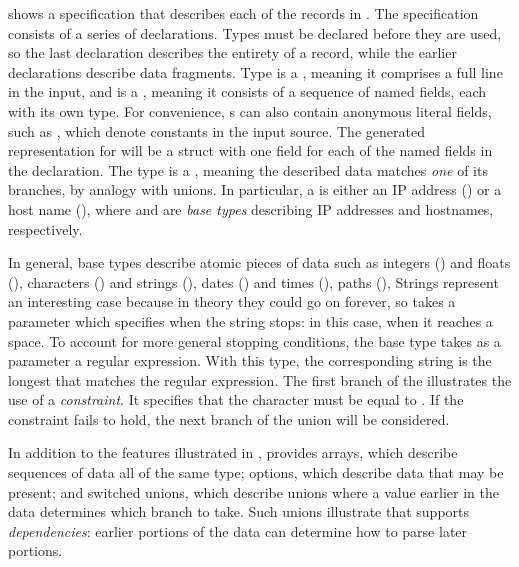  shows a \padsc{} specification that describes each
of the records in .  The specification consists of a
series of declarations. Types must be declared before they are used,
so the last declaration  describes the entirety of a
record, while the earlier declarations describe data fragments.  Type
 is a , meaning it comprises a full line in
the input, and is a , meaning it consists of a sequence of
named fields, each with its own type.  For convenience, s
can also contain anonymous literal fields, such as \cd{" ["}, which
denote constants in the input source.  The generated representation
for  will be a \C{} struct with one field for each of the
named fields in the declaration.
The type  is a , meaning the described data
matches \textit{one} of its branches, by analogy with \C{} unions. In
particular, a  is either an IP address () or a
host name (), where  and  are
\padsc{} \textit{base types} describing IP addresses and hostnames,
respectively.  

In general, base types describe atomic pieces of data such as integers
() and floats (), characters () and
strings (), dates () and times
(), paths (), \etc{} Strings represent an
interesting case because in theory they could go on forever, so
 takes a parameter which specifies when the string stops:
in this case, when it reaches a space.  To account for more general
stopping conditions, the base type  takes as a
parameter a regular expression.  With this type, the corresponding
string is the longest that matches the regular expression.
The first branch of the   illustrates the
use of a \textit{constraint}.  It specifies that the 
character must be equal to .  If the constraint fails to hold,
the next branch of the union will be considered.  

In addition to the features illustrated in , \pads{}
provides arrays, which describe sequences of data all of the same
type; options, which describe data that may be present; and
switched unions, which describe unions where a value earlier in the
data determines which branch to take.  Such unions illustrate that
\pads{} supports \textit{dependencies}: earlier portions of the data
can determine how to parse later portions.

